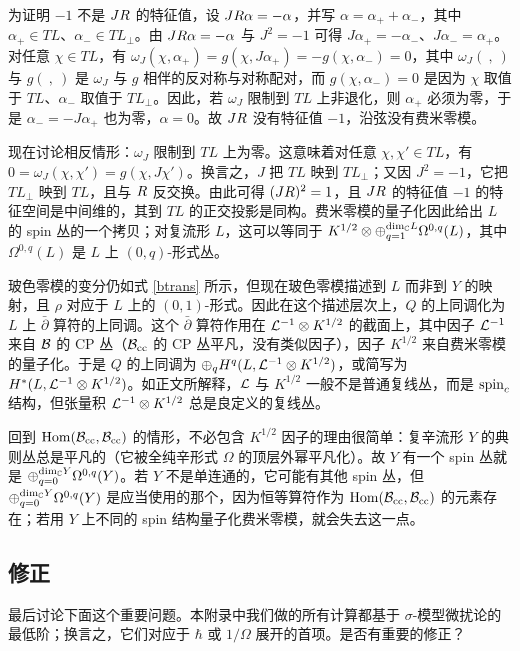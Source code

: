 为证明 $-1$ 不是 $J{R}$ 的特征值，设 $J{R}\alpha=-\alpha$，并写 $\alpha=\alpha_++\alpha_-$，其中 $\alpha_+\in TL$、$\alpha_-\in TL_\perp$。由 $J{R}\alpha=-\alpha$ 与 $J^2=-1$ 可得 $J\alpha_+=-\alpha_-$、$J\alpha_-=\alpha_+$。对任意 $\chi\in TL$，有
$\omega_J(\chi,\alpha_+)=g(\chi,J\alpha_+)=-g(\chi,\alpha_-)=0$，其中 $\omega_J(\ ,\ )$ 与 $g(\ ,\ )$ 是 $\omega_J$ 与 $g$ 相伴的反对称与对称配对，而 $g(\chi,\alpha_-)=0$ 是因为 $\chi$ 取值于 $TL$、$\alpha_-$ 取值于 $TL_\perp$。因此，若 $\omega_J$ 限制到 $TL$ 上非退化，则 $\alpha_+$ 必须为零，于是 $\alpha_-=-J\alpha_+$ 也为零，$\alpha=0$。故 $J{R}$ 没有特征值 $-1$，沿弦没有费米零模。

现在讨论相反情形：$\omega_J$ 限制到 $TL$ 上为零。这意味着对任意 $\chi,\chi'\in TL$，有 $0=\omega_J(\chi,\chi')=g(\chi,J\chi')$。换言之，$J$ 把 $TL$ 映到 $TL_\perp$；又因 $J^2=-1$，它把 $TL_\perp$ 映到 $TL$，且与 ${R}$ 反交换。由此可得 $(J{R})^2=1$，且 $J{R}$ 的特征值 $-1$ 的特征空间是中间维的，其到 $TL$ 的正交投影是同构。费米零模的量子化因此给出 $L$ 的 spin 丛的一个拷贝；对复流形 $L$，这可以等同于 $K^{1/2}\otimes\oplus_{q=1}^{{\mathrm{dim}}_{\mathbb C} L}\Omega^{0,q}(L)$，其中 $\Omega^{0,q}(L)$ 是 $L$ 上 $(0,q)$-形式丛。

玻色零模的变分仍如式 \eqref{btrans} 所示，但现在玻色零模描述到 $L$ 而非到 $Y$ 的映射，且 $\rho$ 对应于 $L$ 上的 $(0,1)$-形式。因此在这个描述层次上，$Q$ 的上同调化为 $L$ 上 $\bar\partial$ 算符的上同调。这个 $\bar\partial$ 算符作用在 ${\mathcal L}^{-1}\otimes K^{1/2}$ 的截面上，其中因子 ${\mathcal L}^{-1}$ 来自 ${\mathcal B}$ 的 CP 丛（${\mathcal B}_{\mathrm{cc}}$ 的 CP 丛平凡，没有类似因子），因子 $K^{1/2}$ 来自费米零模的量子化。于是 $Q$ 的上同调为 $\oplus_qH^q(L,{\mathcal L}^{-1}\otimes K^{1/2})$，或简写为 $H^*(L,{\mathcal L}^{-1}\otimes K^{1/2})$。如正文所解释，${\mathcal L}$ 与 $K^{1/2}$ 一般不是普通复线丛，而是 ${\mathrm{spin}_c}$ 结构，但张量积 ${\mathcal L}^{-1}\otimes K^{1/2}$ 总是良定义的复线丛。

回到 ${\mathrm{Hom}}({\mathcal B}_{\mathrm{cc}},{\mathcal B}_{\mathrm{cc}})$ 的情形，不必包含 $K^{1/2}$ 因子的理由很简单：复辛流形 $Y$ 的典则丛总是平凡的（它被全纯辛形式 $\Omega$ 的顶层外幂平凡化）。故 $Y$ 有一个 spin 丛就是 $\oplus_{q=0}^{{\mathrm{dim}}_{\mathbb C} Y}\Omega^{0,q}(Y)$。若 $Y$ 不是单连通的，它可能有其他 spin 丛，但 $\oplus_{q=0}^{{\mathrm{dim}}_{\mathbb C} Y}\Omega^{0,q}(Y)$ 是应当使用的那个，因为恒等算符作为 ${\mathrm{Hom}}({\mathcal B}_{\mathrm{cc}},{\mathcal B}_{\mathrm{cc}})$ 的元素存在；若用 $Y$ 上不同的 spin 结构量子化费米零模，就会失去这一点。

\subsection{修正}\label{corrections}

最后讨论下面这个重要问题。本附录中我们做的所有计算都基于 $\sigma$-模型微扰论的最低阶；换言之，它们对应于 $\hbar$ 或 $1/\Omega$ 展开的首项。是否有重要的修正？

